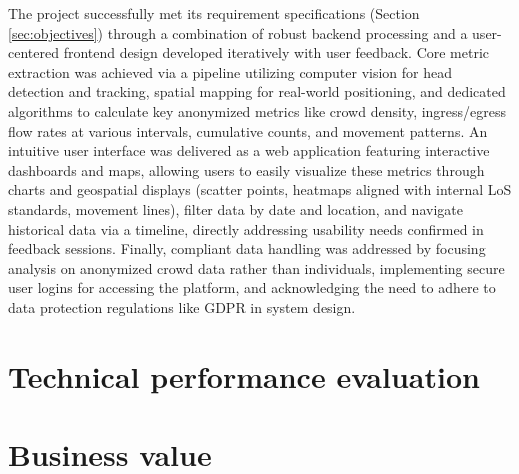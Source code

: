 The project successfully met its requirement specifications (Section \ref{sec:objectives}) through a combination of robust backend processing and a user-centered frontend design developed iteratively with user feedback. Core metric extraction was achieved via a pipeline utilizing computer vision for head detection and tracking, spatial mapping for real-world positioning, and dedicated algorithms to calculate key anonymized metrics like crowd density, ingress/egress flow rates at various intervals, cumulative counts, and movement patterns. An intuitive user interface was delivered as a web application featuring interactive dashboards and maps, allowing users to easily visualize these metrics through charts and geospatial displays (scatter points, heatmaps aligned with internal LoS standards, movement lines), filter data by date and location, and navigate historical data via a timeline, directly addressing usability needs confirmed in feedback sessions. Finally, compliant data handling was addressed by focusing analysis on anonymized crowd data rather than individuals, implementing secure user logins for accessing the platform, and acknowledging the need to adhere to data protection regulations like GDPR in system design.


\section{Technical performance evaluation}


\section{Business value}